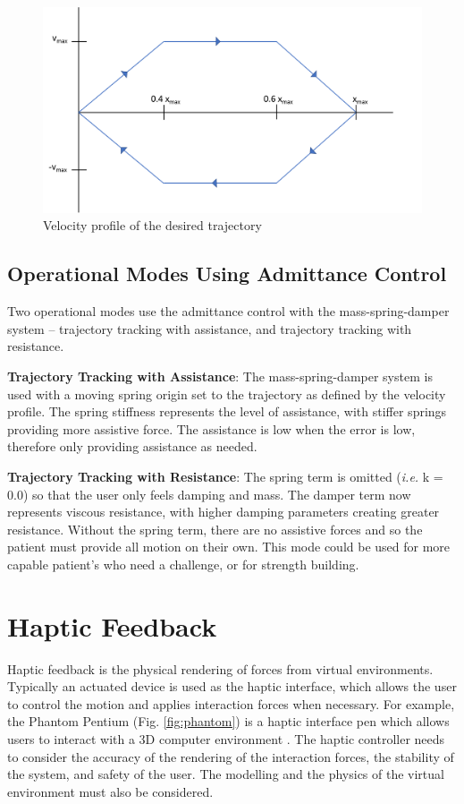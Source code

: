 \documentclass[12pt]{report}
\begin{document}
	\begin{figure}[h] 
		\centering
		\includegraphics[width=0.75\linewidth]{velocity_profile}
		\caption{Velocity profile of the desired trajectory}
		\label{fig:velocity_profile}
	\end{figure}
	
	
	
	\subsection{Operational Modes Using Admittance Control}
	
	Two operational modes use the admittance control with the mass-spring-damper system -- trajectory tracking with assistance, and trajectory tracking with resistance. 
	
	\textbf{Trajectory Tracking with Assistance}: The mass-spring-damper system is used with a moving spring origin set to the trajectory as defined by the velocity profile. The spring stiffness represents the level of assistance, with stiffer springs providing more assistive force. The assistance is low when the error is low, therefore only providing assistance as needed. 
	
	\textbf{Trajectory Tracking with Resistance}: The spring term is omitted (\textit{i.e.} k = 0.0) so that the user only feels damping and mass. The damper term now represents viscous resistance, with higher damping parameters creating greater resistance. Without the spring term, there are no assistive forces and so the patient must provide all motion on their own. This mode could be used for more capable patient's who need a challenge, or for strength building. 
	
	

	\section{Haptic Feedback} \label{sec:haptic}
	
	
	Haptic feedback is the physical rendering of forces from virtual environments. Typically an actuated device is used as the haptic interface, which allows the user to control the motion and applies interaction forces when necessary. For example, the Phantom Pentium (Fig. \ref{fig:phantom}) is a haptic interface pen which allows users to interact with a 3D computer environment \cite{Massie1994}. The haptic controller needs to consider the accuracy of the rendering of the interaction forces, the stability of the system, and safety of the user. The modelling and the physics of the virtual environment must also be considered. 		
		
\end{document}
